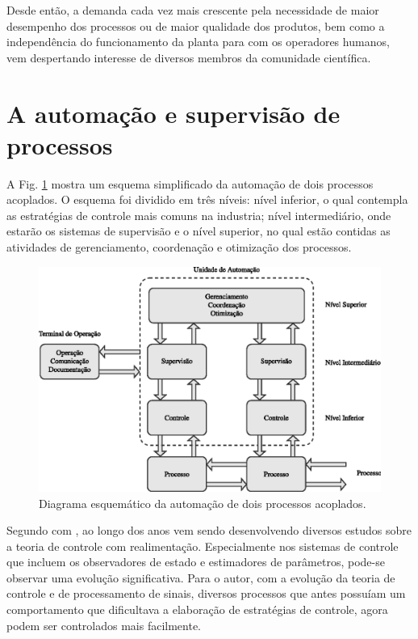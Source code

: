
Desde então, a demanda cada vez mais crescente pela necessidade de maior
desempenho dos processos ou de maior qualidade dos produtos, bem como a
independência do funcionamento da planta para com os operadores humanos, vem
despertando interesse de diversos membros da comunidade científica.


\section{A automação e supervisão de processos}
A Fig. \ref{fig:esquema_automacao} mostra um esquema simplificado da automação
de dois processos acoplados. O esquema foi dividido em três níveis: nível
inferior, o qual contempla as estratégias de controle mais comuns na industria;
nível intermediário, onde estarão os sistemas de supervisão e o nível superior,
no qual estão contidas as atividades de gerenciamento, coordenação e otimização
dos processos.

\begin{figure}[!htb]
\centering
    \includegraphics{imgs/introducao/eps/esquema_automacao}
    \caption{Diagrama esquemático da automação de dois processos acoplados.}
    \label{fig:esquema_automacao}
\end{figure}

Segundo com , ao longo dos anos vem sendo
desenvolvendo diversos estudos sobre a teoria de controle com realimentação.
Especialmente nos sistemas de controle que incluem os observadores de estado e
estimadores de parâmetros, pode-se observar uma evolução significativa. Para o
autor, com a evolução da teoria de controle e de processamento de sinais,
diversos processos que antes possuíam um comportamento que dificultava a
elaboração de estratégias de controle, agora podem ser controlados mais
facilmente.

